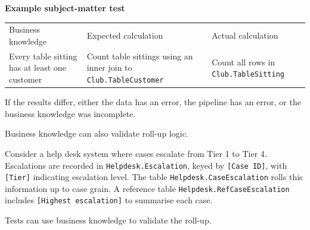 \documentclass[10pt,openany,10pt]{book}
\newcounter{none}
\let\podeToprule\toprule
\let\podeMidrule\midrule
\let\podeBottomrule\bottomrule
\renewcommand{\toprule}{\arrayrulecolor{pbiGrid}\podeToprule}
\renewcommand{\midrule}{\arrayrulecolor{pbiGrid}\podeMidrule}
\renewcommand{\bottomrule}{\arrayrulecolor{pbiGrid}\podeBottomrule}
\begin{document}
\textbf{Example subject-matter test}

{\def\LTcaptype{none} %
\begin{longtable}[]{@{}
  >{\raggedright\arraybackslash}p{}
  >{\raggedright\arraybackslash}p{}
  >{\raggedright\arraybackslash}p{}@{}}
\toprule\noalign{}
\begin{minipage}[b]{\linewidth}\raggedright
Business knowledge
\end{minipage} & \begin{minipage}[b]{\linewidth}\raggedright
Expected calculation
\end{minipage} & \begin{minipage}[b]{\linewidth}\raggedright
Actual calculation
\end{minipage} \\
\midrule\noalign{}
\endhead
\bottomrule\noalign{}
\endlastfoot
Every table sitting has at least one customer & Count table sittings
using an inner join to \texttt{Club.TableCustomer} & Count all rows in
\texttt{Club.TableSitting} \\
\end{longtable}
}

If the results differ, either the data has an error, the pipeline has an
error, or the business knowledge was incomplete.

Business knowledge can also validate roll-up logic.

Consider a help desk system where cases escalate from Tier 1 to Tier 4.
Escalations are recorded in \texttt{Helpdesk.Escalation}, keyed by
\texttt{{[}Case\ ID{]}}, with \texttt{{[}Tier{]}} indicating escalation
level. The table \texttt{Helpdesk.CaseEscalation} rolls this information
up to case grain. A reference table \texttt{Helpdesk.RefCaseEscalation}
includes \texttt{{[}Highest\ escalation{]}} to summarise each case.

Tests can use business knowledge to validate the roll-up.
\end{document}
